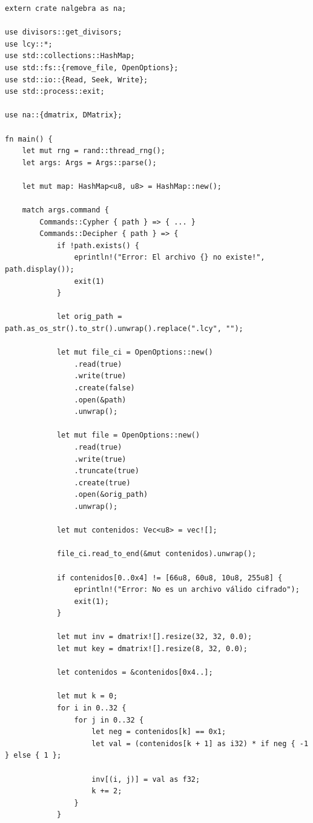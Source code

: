 \documentclass[a4paper]{article}
\begin{document}
\begin{verbatim}
extern crate nalgebra as na;

use divisors::get_divisors;
use lcy::*;
use std::collections::HashMap;
use std::fs::{remove_file, OpenOptions};
use std::io::{Read, Seek, Write};
use std::process::exit;

use na::{dmatrix, DMatrix};

fn main() {
    let mut rng = rand::thread_rng();
    let args: Args = Args::parse();

    let mut map: HashMap<u8, u8> = HashMap::new();

    match args.command {
        Commands::Cypher { path } => { ... }
        Commands::Decipher { path } => {
            if !path.exists() {
                eprintln!("Error: El archivo {} no existe!", path.display());
                exit(1)
            }

            let orig_path = path.as_os_str().to_str().unwrap().replace(".lcy", "");

            let mut file_ci = OpenOptions::new()
                .read(true)
                .write(true)
                .create(false)
                .open(&path)
                .unwrap();

            let mut file = OpenOptions::new()
                .read(true)
                .write(true)
                .truncate(true)
                .create(true)
                .open(&orig_path)
                .unwrap();

            let mut contenidos: Vec<u8> = vec![];

            file_ci.read_to_end(&mut contenidos).unwrap();

            if contenidos[0..0x4] != [66u8, 60u8, 10u8, 255u8] {
                eprintln!("Error: No es un archivo válido cifrado");
                exit(1);
            }

            let mut inv = dmatrix![].resize(32, 32, 0.0);
            let mut key = dmatrix![].resize(8, 32, 0.0);

            let contenidos = &contenidos[0x4..];

            let mut k = 0;
            for i in 0..32 {
                for j in 0..32 {
                    let neg = contenidos[k] == 0x1;
                    let val = (contenidos[k + 1] as i32) * if neg { -1 } else { 1 };

                    inv[(i, j)] = val as f32;
                    k += 2;
                }
            }


\end{verbatim}
\end{document}
